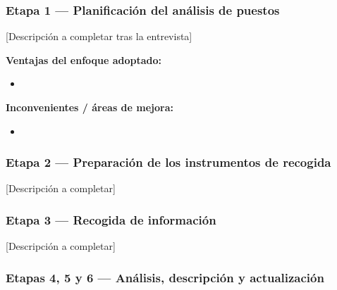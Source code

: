\subsubsection{Etapa 1 — Planificación del análisis de puestos}


[Descripción a completar tras la entrevista]

\textbf{Ventajas del enfoque adoptado:}
\begin{itemize}
  \item [Completar]
\end{itemize}

\textbf{Inconvenientes / áreas de mejora:}
\begin{itemize}
  \item [Completar]
\end{itemize}

\subsubsection{Etapa 2 — Preparación de los instrumentos de recogida}


[Descripción a completar]

\subsubsection{Etapa 3 — Recogida de información}


[Descripción a completar]

\subsubsection{Etapas 4, 5 y 6 — Análisis, descripción y actualización}

